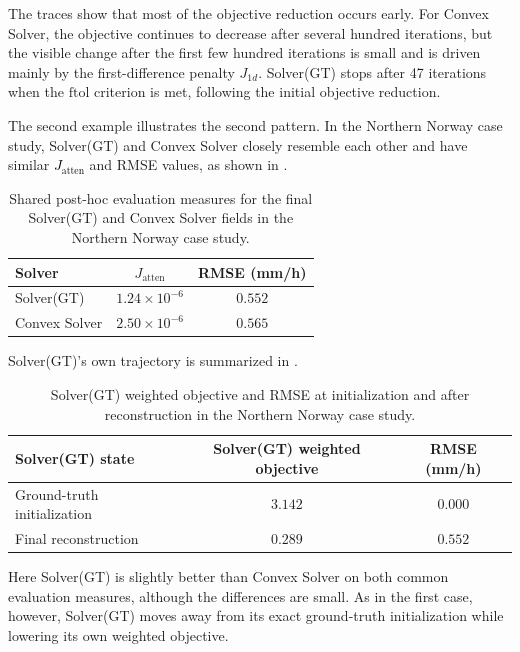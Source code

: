 \documentclass[11pt]{article}
\begin{document}
{\color{black}The traces show that most of the objective reduction occurs early. For Convex Solver, the objective continues to decrease after several hundred iterations, but the visible change after the first few hundred iterations is small and is driven mainly by the first-difference penalty $J_{1d}$. Solver(GT) stops after 47 iterations when the $\mathrm{ftol}$ criterion is met, following the initial objective reduction.}
\medskip

The second example illustrates the second pattern. In the Northern Norway case study, Solver(GT) and Convex Solver closely resemble each other and have similar \textcolor{black}{$J_{\mathrm{atten}}$} and RMSE values, as shown in .

\begin{table}[H]
\centering
\begin{tabular}{lcc}
\toprule
Solver & $J_{\mathrm{atten}}$ & RMSE (mm/h) \\
\midrule
Solver(GT) & $1.24\times10^{-6}$ & $0.552$ \\
Convex Solver & $2.50\times10^{-6}$ & $0.565$ \\
\bottomrule
\end{tabular}
\caption{Shared post-hoc evaluation measures for the final Solver(GT) and Convex Solver fields in the Northern Norway case study.}
\label{tab:norway_common_measures}
\end{table}

{\color{black}Solver(GT)'s own trajectory is summarized in .}

\begin{table}[H]
\centering
\begin{tabular}{lcc}
\toprule
Solver(GT) state & Solver(GT) weighted objective & RMSE (mm/h) \\
\midrule
Ground-truth initialization & $3.142$ & $0.000$ \\
Final reconstruction & $0.289$ & $0.552$ \\
\bottomrule
\end{tabular}
\caption{Solver(GT) weighted objective and RMSE at initialization and after reconstruction in the Northern Norway case study.}
\label{tab:norway_solver_gt_state}
\end{table}
{\color{black}Here Solver(GT) is slightly better than Convex Solver on both common evaluation measures, although the differences are small. As in the first case, however, Solver(GT) moves away from its exact ground-truth initialization while lowering its own weighted objective.}
\end{document}
